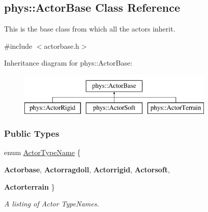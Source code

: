 \hypertarget{classphys_1_1ActorBase}{
\subsection{phys::ActorBase Class Reference}
\label{d8/d0f/classphys_1_1ActorBase}
}


This is the base class from which all the actors inherit.  




{\ttfamily \#include $<$actorbase.h$>$}

Inheritance diagram for phys::ActorBase:\begin{figure}[H]
\begin{center}
\leavevmode
\includegraphics[height=2.000000cm]{d8/d0f/classphys_1_1ActorBase}
\end{center}
\end{figure}
\subsubsection*{Public Types}
\begin{DoxyCompactItemize}
\item 
enum \hyperlink{classphys_1_1ActorBase_aff3a7c464e8ce82576073f8f891434b7}{ActorTypeName} \{ \par
{\bfseries Actorbase}, 
{\bfseries Actorragdoll}, 
{\bfseries Actorrigid}, 
{\bfseries Actorsoft}, 
\par
{\bfseries Actorterrain}
 \}
\begin{DoxyCompactList}\small\item\em A listing of Actor TypeNames. \item\end{DoxyCompactList}\end{DoxyCompactItemize}
